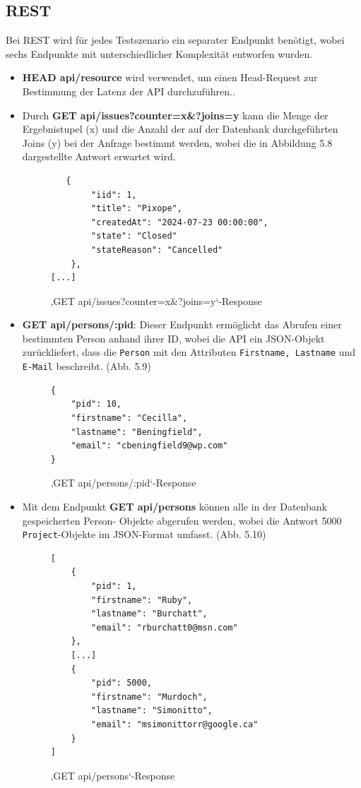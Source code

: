 \subsection{REST}
\label{sec:rest}
Bei REST wird für jedes Testszenario ein separater Endpunkt benötigt, wobei sechs Endpunkte mit unterschiedlicher Komplexität entworfen wurden.

\begin{itemize}
\item \colorbox{gray!20}{\textbf{HEAD api/resource}} wird verwendet, um einen Head-Request zur Bestimmung der Latenz der API durchzuführen..
\item Durch \colorbox{gray!20}{\textbf{GET api/issues?counter=x\&?joins=y}} kann die Menge der Ergebnistupel (x) und die Anzahl der auf der Datenbank durchgeführten Joins (y) bei der Anfrage bestimmt werden, wobei die in Abbildung 5.8 dargestellte Antwort erwartet wird.
\begin{figure}[H]
\begin{center}
\begin{BVerbatim}
   {
        "iid": 1,
        "title": "Pixope",
        "createdAt": "2024-07-23 00:00:00",
        "state": "Closed"
        "stateReason": "Cancelled"
    },
[...]
\end{BVerbatim}
\end{center}
\caption{‚GET api/issues?counter=x\&?joins=y‘-Response}
\end{figure}


\item \colorbox{gray!20}{\textbf{GET api/persons/:pid}}: Dieser Endpunkt ermöglicht das Abrufen einer bestimmten Person anhand ihrer ID, wobei die API ein JSON-Objekt zurückliefert, dass die \texttt{Person} mit den Attributen \texttt{Firstname, Lastname} und \texttt{E-Mail} beschreibt. (Abb. 5.9)
\begin{figure}[H]
\begin{center}
\begin{BVerbatim}
{
    "pid": 10,
    "firstname": "Cecilla",
    "lastname": "Beningfield",
    "email": "cbeningfield9@wp.com"
}
\end{BVerbatim}
\end{center}
\caption{‚GET api/persons/:pid‘-Response}
\end{figure}
\newpage
\item Mit dem Endpunkt  \colorbox{gray!20}{\textbf{GET api/persons}} können alle in der Datenbank gespeicherten Person- Objekte abgerufen werden, wobei die Antwort 5000  \texttt{Project}-Objekte im JSON-Format umfasst. (Abb. 5.10)
\begin{figure}[H]
\begin{center}
\begin{BVerbatim}
[
    {
        "pid": 1,
        "firstname": "Ruby",
        "lastname": "Burchatt",
        "email": "rburchatt0@msn.com"
    },
	[...]
    {
        "pid": 5000,
        "firstname": "Murdoch",
        "lastname": "Simonitto",
        "email": "msimonittorr@google.ca"
    }
]
\end{BVerbatim}
\end{center}
\caption{‚GET api/persons‘-Response}
\end{figure}


\end{itemize}
